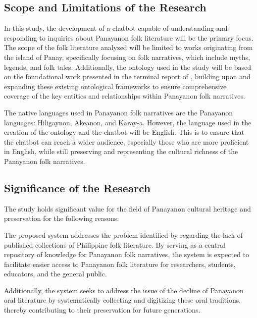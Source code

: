 \subsection{Scope and Limitations of the Research}
\label{sec:scopelimitations}

In this study, the development of a chatbot capable of understanding and responding to inquiries about Panayanon folk literature will be the primary focus. The scope of the folk literature analyzed will be limited to works originating from the island of Panay, specifically focusing on folk narratives, which include myths, legends, and folk tales. Additionally, the ontology used in the study will be based on the foundational work presented in the terminal report of , building upon and expanding these existing ontological frameworks to ensure comprehensive coverage of the key entities and relationships within Panayanon folk narratives. 

The native languages used in Panayanon folk narratives are the Panayanon languages: Hiligaynon, Akeanon, and Karay-a. However, the language used in the creation of the ontology and the chatbot will be English. This is to ensure that the chatbot can reach a wider audience, especially those who are more proficient in English, while still preserving and representing the cultural richness of the Panayanon folk narratives. 



\subsection{Significance of the Research}
\label{sec:significance}
The study holds significant value for the field of Panayanon cultural heritage and preservation for the following reasons:

The proposed system addresses the problem identified by  regarding the lack of published collections of Philippine folk literature. By serving as a central repository of knowledge for Panayanon folk narratives, the system is expected to facilitate easier access to Panayanon folk literature for researchers, students, educators, and the general public.

Additionally, the system seeks to address the issue of the decline of Panayanon oral literature by systematically collecting and digitizing these oral traditions, thereby contributing to their preservation for future generations.


